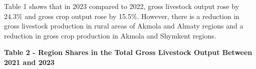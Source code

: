 
Table 1 shows that in 2023 compared to 2022, gross livestock output rose
by 24.3\% and gross crop output rose by 15.5\%. However, there is a
reduction in gross livestock production in rural areas of Akmola and
Almaty regions and a reduction in gross crop production in Akmola and
Shymkent regions.

{\bfseries Table 2 - Region Shares in the Total Gross Livestock Output
Between 2021 and 2023}

